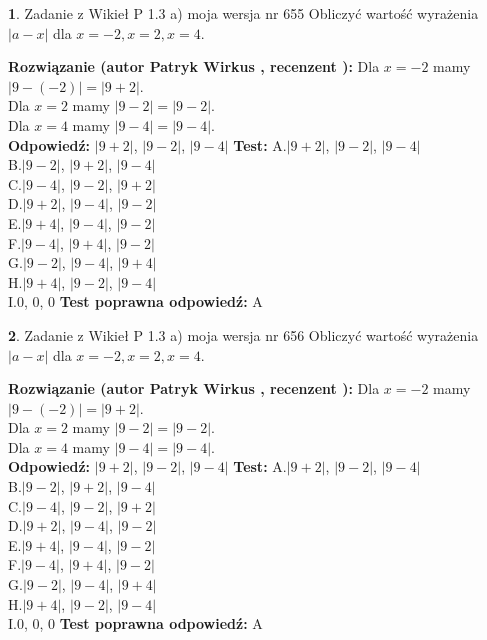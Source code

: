 \documentclass[12pt, a4paper]{article}
\theoremstyle{definition} %
\newtheorem{zad}{}
\newcommand{\zadStart}[1]{\begin{zad}#1\newline}
\newcommand{\zadStop}{\end{zad}}
\newcommand{\rozwStart}[2]{\noindent \textbf{Rozwiązanie (autor #1 , recenzent #2): }\newline}
\newcommand{\rozwStop}{\newline}
\newcommand{\odpStart}{\noindent \textbf{Odpowiedź:}\newline}
\newcommand{\odpStop}{\newline}
\newcommand{\testStart}{\noindent \textbf{Test:}\newline}
\newcommand{\testStop}{\newline}
\newcommand{\kluczStart}{\noindent \textbf{Test poprawna odpowiedź:}\newline}
\newcommand{\kluczStop}{\newline}
\begin{document}
\zadStart{Zadanie z Wikieł P 1.3 a) moja wersja nr 655}
Obliczyć wartość wyrażenia $|a - x|$ dla $x=-2,x=2,x=4$.
\zadStop
\rozwStart{Patryk Wirkus}{}
Dla $x = -2$ mamy $|9 - (-2)| = |9 + 2|$.\\
Dla $x = 2$ mamy $|9 - 2| = |9 - 2|$.\\
Dla $x = 4$ mamy $|9 - 4| = |9 - 4|$.\\
\rozwStop
\odpStart
$|9 + 2|$, $|9 - 2|$, $|9 - 4|$
\odpStop
\testStart
A.$|9 + 2|$, $|9 - 2|$, $|9 - 4|$\\
B.$|9 - 2|$, $|9 + 2|$, $|9 - 4|$\\
C.$|9 - 4|$, $|9 - 2|$, $|9 + 2|$\\
D.$|9 + 2|$, $|9 - 4|$, $|9 - 2|$\\
E.$|9 + 4|$, $|9 - 4|$, $|9 - 2|$\\
F.$|9 - 4|$, $|9 + 4|$, $|9 - 2|$\\
G.$|9 - 2|$, $|9 - 4|$, $|9 + 4|$\\
H.$|9 + 4|$, $|9 - 2|$, $|9 - 4|$\\
I.$0$, $0$, $0$
\testStop
\kluczStart
A
\kluczStop



\zadStart{Zadanie z Wikieł P 1.3 a) moja wersja nr 656}
Obliczyć wartość wyrażenia $|a - x|$ dla $x=-2,x=2,x=4$.
\zadStop
\rozwStart{Patryk Wirkus}{}
Dla $x = -2$ mamy $|9 - (-2)| = |9 + 2|$.\\
Dla $x = 2$ mamy $|9 - 2| = |9 - 2|$.\\
Dla $x = 4$ mamy $|9 - 4| = |9 - 4|$.\\
\rozwStop
\odpStart
$|9 + 2|$, $|9 - 2|$, $|9 - 4|$
\odpStop
\testStart
A.$|9 + 2|$, $|9 - 2|$, $|9 - 4|$\\
B.$|9 - 2|$, $|9 + 2|$, $|9 - 4|$\\
C.$|9 - 4|$, $|9 - 2|$, $|9 + 2|$\\
D.$|9 + 2|$, $|9 - 4|$, $|9 - 2|$\\
E.$|9 + 4|$, $|9 - 4|$, $|9 - 2|$\\
F.$|9 - 4|$, $|9 + 4|$, $|9 - 2|$\\
G.$|9 - 2|$, $|9 - 4|$, $|9 + 4|$\\
H.$|9 + 4|$, $|9 - 2|$, $|9 - 4|$\\
I.$0$, $0$, $0$
\testStop
\kluczStart
A
\kluczStop
\end{document}
